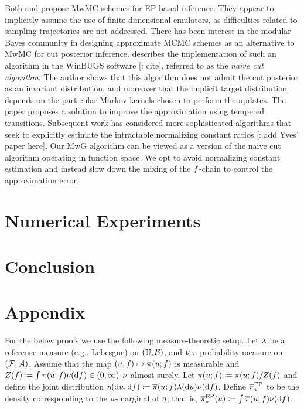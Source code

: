 \documentclass[12pt]{article}
\begin{document}
Both \citep{garegnani2021NoisyMCMC} and \citet{BurknerSurrogate} propose MwMC schemes
for EP-based inference. They appear to implicitly assume the use of finite-dimensional emulators,
as difficulties related to sampling trajectories are not addressed. There has been interest in the 
modular Bayes community in designing approximate MCMC schemes as an alternative to
MwMC for cut posterior inference. \citet{PlummerCut} describes the implementation of such 
an algorithm in the WinBUGS software [\todo: cite], referred to as the \textit{naive cut algorithm}.
The author shows that this algorithm does not admit the cut posterior as an invariant
distribution, and moreover that the implicit target distribution depends on the particular Markov kernels
chosen to perform the updates. The paper proposes a solution to improve the approximation 
using tempered transitions. Subsequent work has considered more sophisticated algorithms
that seek to explicitly estimate the intractable normalizing constant ratios
\citep{SAACut} [\todo: add Yves' paper here]. 
Our MwG algorithm can be viewed as a version of the naive cut algorithm operating in function space.
We opt to avoid normalizing constant estimation and instead slow down the mixing of the 
$f$-chain to control the approximation error.

\section{Numerical Experiments} \label{sec:experiments}
\section{Conclusion} \label{sec:conclusion}

\section{Appendix}

For the below proofs we use the following measure-theoretic setup.
Let $\lambda$ be a reference measure (e.g., Lebesgue) on $(\mathbb{U}, \mathcal{B})$,
and $\nu$ a probability measure on $(\mathcal{F}, \mathcal{A})$. Assume that 
the map $(u, f) \mapsto \pi(u; f)$ is measurable
and $\normCst(\targetTraj) \Def \int \postDens(\Par; \targetTraj) \emDist(\d\targetTraj) \in (0,\infty)$
$\nu$-almost surely. Let $\overline{\pi}(u; f) \coloneqq \pi(u; f) / Z(f)$
and define the joint distribution 
$\emJoint(\d\Par, \d\targetTraj) \Def \postDensNorm(\Par; \targetTraj) \refMeas(\d\Par)\emDist(\d\targetTraj)$.
Define ${\overline{\pi}}_{\star}^{\mathrm{EP}}$ to be the density corresponding to the $u$-marginal of $\eta$; that is,
$\postApproxEP(\Par) \Def \int \postDensNorm(\Par; \targetTraj) \emDist(\d\targetTraj)$. 
\end{document}
